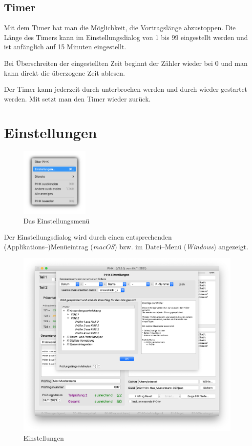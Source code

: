 \documentclass[a4paper,notitlepage,parskip=half]{scrartcl}
\begin{document}
\subsection{Timer}
Mit dem Timer hat man die Möglichkeit, die Vortragslänge abzustoppen.
Die Länge des Timers kann im Einstellungsdialog von 1 bis 99 eingestellt werden und ist anfänglich auf 15 Minuten eingestellt.

Bei Überschreiten der eingestellten Zeit beginnt der Zähler wieder bei 0 und man kann direkt die überzogene Zeit ablesen.

Der Timer kann jederzeit durch  unterbrochen werden und durch  wieder gestartet werden. Mit  setzt man den Timer wieder zurück.

\section{Einstellungen}
\label{sec:einstellungen}
\begin{figure}[ht]
  \centering
  \includegraphics[width=0.3\textwidth]{menu0.png}
  \caption{Das Einstellungsmenü}
  \label{fig:menu}
\end{figure}

Der Einstellungsdialog wird durch einen entsprechenden (Applikations--)Menüeintrag (\emph{macOS}) bzw. im Datei--Menü (\emph{Windows}) angezeigt.

\begin{figure}[ht]
  \centering
  \includegraphics[width=\textwidth]{Einstellungen.png}
  \caption{Einstellungen}
  \label{fig:einstellungen}
\end{figure}
\end{document}

